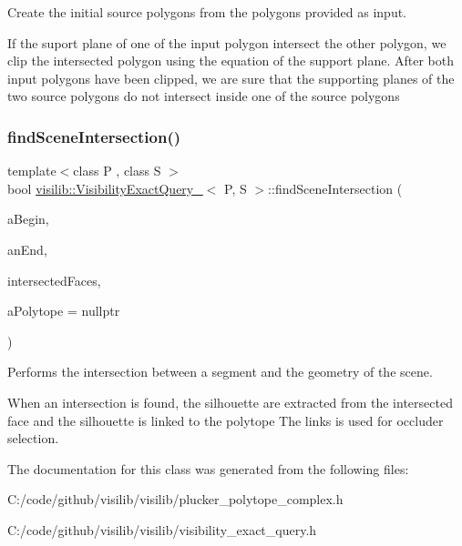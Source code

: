 Create the initial source polygons from the polygons provided as input. 

If the suport plane of one of the input polygon intersect the other polygon, we clip the intersected polygon using the equation of the support plane. After both input polygons have been clipped, we are sure that the supporting planes of the two source polygons do not intersect inside one of the source polygons \mbox{\label{classvisilib_1_1_visibility_exact_query___a9aecc3e02e9f23bfd1911f67833db419}} 
\subsubsection{\texorpdfstring{findSceneIntersection()}{findSceneIntersection()}}
{\footnotesize\ttfamily template$<$class P , class S $>$ \\
bool \mbox{\hyperlink{classvisilib_1_1_visibility_exact_query__}{visilib\+::\+Visibility\+Exact\+Query\+\_\+}}$<$ P, S $>$\+::find\+Scene\+Intersection (\begin{DoxyParamCaption}\item[{const \mbox{\hyperlink{classvisilib_1_1_math_vector3__}{Math\+Vector3d}} \&}]{a\+Begin,  }\item[{const \mbox{\hyperlink{classvisilib_1_1_math_vector3__}{Math\+Vector3d}} \&}]{an\+End,  }\item[{std\+::set$<$ \mbox{\hyperlink{classvisilib_1_1_silhouette_mesh_face}{Silhouette\+Mesh\+Face}} $\ast$ $>$ \&}]{intersected\+Faces,  }\item[{\mbox{\hyperlink{classvisilib_1_1_plucker_polytope}{Plucker\+Polytope}}$<$ P $>$ $\ast$}]{a\+Polytope = {\ttfamily nullptr} }\end{DoxyParamCaption})}



Performs the intersection between a segment and the geometry of the scene. 

When an intersection is found, the silhouette are extracted from the intersected face and the silhouette is linked to the polytope The links is used for occluder selection. 

The documentation for this class was generated from the following files\+:\begin{DoxyCompactItemize}
\item 
C\+:/code/github/visilib/visilib/plucker\+\_\+polytope\+\_\+complex.\+h\item 
C\+:/code/github/visilib/visilib/visibility\+\_\+exact\+\_\+query.\+h\end{DoxyCompactItemize}

